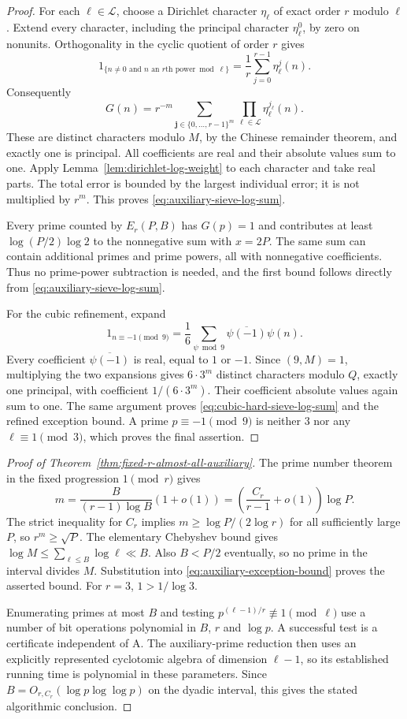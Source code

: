 \documentclass[11pt]{article}
\theoremstyle{definition}
\theoremstyle{remark}
\begin{document}
\begin{proof}
For each $\ell\in\mathcal L$, choose a Dirichlet character
$\eta_\ell$ of exact order $r$ modulo $\ell$.  Extend every character,
including the principal character $\eta_\ell^0$, by zero on
nonunits.  Orthogonality in the cyclic quotient of order $r$ gives
\[
 1_{\{n\ne0\text{ and }n\text{ an }r\text{th power}\bmod\ell\}}
 =\frac1r\sum_{j=0}^{r-1}\eta_\ell^j(n).
\]
Consequently
\[
 G(n)=r^{-m}\sum_{\boldsymbol j\in\{0,\ldots,r-1\}^m}
          \prod_{\ell\in\mathcal L}\eta_\ell^{j_\ell}(n).
\]
These are distinct characters modulo $M$, by the Chinese remainder
theorem, and exactly one is principal.  All coefficients are real and
their absolute values sum to one.  Apply
Lemma~\ref{lem:dirichlet-log-weight} to each character and take real
parts.  The total error is bounded by the largest individual error;
it is not multiplied by $r^m$.  This proves
\eqref{eq:auxiliary-sieve-log-sum}.

Every prime counted by $E_r(P,B)$ has $G(p)=1$ and contributes at
least $\log(P/2)\log2$ to the nonnegative sum with $x=2P$.
The same sum can contain additional primes and prime powers, all
with nonnegative coefficients.  Thus no prime-power subtraction is
needed, and the first bound follows directly from
\eqref{eq:auxiliary-sieve-log-sum}.

For the cubic refinement, expand
\[
 1_{n\equiv-1\pmod9}
   =\frac16\sum_{\psi\bmod9}\overline{\psi(-1)}\psi(n).
\]
Every coefficient $\overline{\psi(-1)}$ is real, equal to $1$ or
$-1$.  Since $(9,M)=1$, multiplying the two expansions gives
$6\cdot3^m$ distinct characters modulo $Q$, exactly one principal,
with coefficient $1/(6\cdot3^m)$.  Their coefficient absolute values
again sum to one.  The same argument proves
\eqref{eq:cubic-hard-sieve-log-sum} and the refined exception bound.
A prime $p\equiv-1\pmod9$ is neither $3$ nor any
$\ell\equiv1\pmod3$, which proves the final assertion.
\end{proof}

\begin{proof}[Proof of Theorem~\ref{thm:fixed-r-almost-all-auxiliary}]
The prime number theorem in the fixed progression $1\pmod r$ gives
\[
 m=\frac{B}{(r-1)\log B}(1+o(1))
   =\left(\frac{C_r}{r-1}+o(1)\right)\log P.
\]
The strict inequality for $C_r$ implies $m\ge\log P/(2\log r)$
for all sufficiently large $P$, so $r^m\ge\sqrt P$.
The elementary Chebyshev bound gives
$\log M\le\sum_{\ell\le B}\log\ell\ll B$.
Also $B<P/2$ eventually, so no prime in the interval divides $M$.
Substitution into \eqref{eq:auxiliary-exception-bound} proves the
asserted bound.  For $r=3$, $1>1/\log3$.

Enumerating primes at most $B$ and testing
$p^{(\ell-1)/r}\not\equiv1\pmod\ell$ use a number of bit
operations polynomial in $B$, $r$ and $\log p$.  A successful test is
a certificate independent of A.  The auxiliary-prime reduction then
uses an explicitly represented cyclotomic algebra of dimension
$\ell-1$, so its established running time is polynomial in these
parameters.  Since $B=O_{r,C_r}(\log p\log\log p)$ on the dyadic
interval, this gives the stated algorithmic conclusion.
\end{proof}
\end{document}
